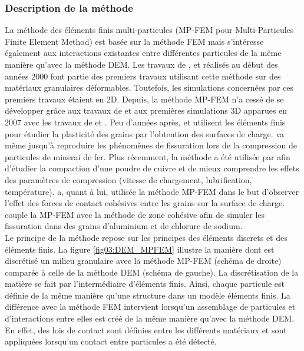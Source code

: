 		\subsubsection{Description de la méthode}
			La méthode des éléments finis multi-particules (MP-FEM pour Multi-Particules Finite Element Method) est basée sur la méthode FEM mais s'intéresse également aux interactions existantes entre différentes particules de la même manière qu'avec la méthode DEM. Les travaux de \citet{ransing_powder_2000}, \citeauthor{gethin_numerical_2001} \citep{gethin_numerical_2001, gethin_two_2006} et \citet{lewis_combined_2005} réalisés au début des années 2000 font partie des premiers travaux utilisant cette méthode sur des matériaux granulaires déformables. Toutefois, les simulations concernées par ces premiers travaux étaient en 2D. Depuis, la méthode MP-FEM n'a cessé de se développer grâce aux travaux de \citet{procopio_simulation_2005} et aux premières simulations 3D apparues en 2007 avec les travaux de \citet{chen_numerical_2007} et \citeauthor{frenning_efficient_2008} \citep{frenning_efficient_2008, frenning_compression_2010}. Peu d'années après, \citet{schmidt_simulation_2010} et \citet{harthong_study_2012} utilisent les éléments finis pour étudier la plasticité des grains par l'obtention des surfaces de charge. \citet{gustafsson_multi_2013} va même jusqu'à reproduire les phénomènes de fissuration lors de la compression de particules de minerai de fer. Plus récemment, la méthode a été utilisée par \citeauthor{guner_numerical_2015} \citep{guner_numerical_2015, guner_effects_2018} afin d'étudier la compaction d'une poudre de cuivre et de mieux comprendre les effets des paramètres de compression (vitesse de chargement, lubrification, température). \citet{loidolt_modeling_2018} a, quant à lui, utilisée la méthode MP-FEM dans le but d'observer l'effet des forces de contact cohésives entre les grains sur la surface de charge. \citet{feng_cohesive_2019} couple la MP-FEM avec la méthode de zone cohésive afin de simuler les fissuration dans des grains d'aluminium et de chlorure de sodium.
			\\Le principe de la méthode repose sur les principes des éléments discrets et des éléments finis. La figure \ref{fig03:DEM_MPFEM} illustre la manière dont est discrétisé un milieu granulaire avec la méthode MP-FEM (schéma de droite) comparée à celle de la méthode DEM (schéma de gauche). La discrétisation de la matière se fait par l'intermédiaire d'éléments finis. Ainsi, chaque particule est définie de la même manière qu'une structure dans un modèle éléments finis. La différence avec la méthode FEM intervient lorsqu'un assemblage de particules et d'interactions entre elles est créé de la même manière qu'avec la méthode DEM. En effet, des lois de contact sont définies entre les différents matériaux et sont appliquées lorsqu'un contact entre particules a été détecté.
